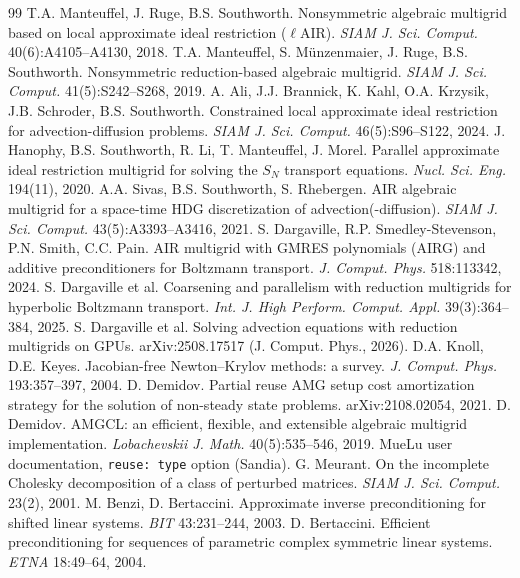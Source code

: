 \documentclass[11pt,a4paper]{article}
\begin{document}
\small
\begin{thebibliography}{99}
 T.A. Manteuffel, J. Ruge, B.S. Southworth. Nonsymmetric algebraic multigrid based on local approximate ideal restriction ($\ell$AIR). \emph{SIAM J. Sci. Comput.} 40(6):A4105--A4130, 2018.
 T.A. Manteuffel, S. M\"unzenmaier, J. Ruge, B.S. Southworth. Nonsymmetric reduction-based algebraic multigrid. \emph{SIAM J. Sci. Comput.} 41(5):S242--S268, 2019.
 A. Ali, J.J. Brannick, K. Kahl, O.A. Krzysik, J.B. Schroder, B.S. Southworth. Constrained local approximate ideal restriction for advection-diffusion problems. \emph{SIAM J. Sci. Comput.} 46(5):S96--S122, 2024.
 J. Hanophy, B.S. Southworth, R. Li, T. Manteuffel, J. Morel. Parallel approximate ideal restriction multigrid for solving the $S_N$ transport equations. \emph{Nucl. Sci. Eng.} 194(11), 2020.
 A.A. Sivas, B.S. Southworth, S. Rhebergen. AIR algebraic multigrid for a space-time HDG discretization of advection(-diffusion). \emph{SIAM J. Sci. Comput.} 43(5):A3393--A3416, 2021.
 S. Dargaville, R.P. Smedley-Stevenson, P.N. Smith, C.C. Pain. AIR multigrid with GMRES polynomials (AIRG) and additive preconditioners for Boltzmann transport. \emph{J. Comput. Phys.} 518:113342, 2024.
 S. Dargaville et al. Coarsening and parallelism with reduction multigrids for hyperbolic Boltzmann transport. \emph{Int. J. High Perform. Comput. Appl.} 39(3):364--384, 2025.
 S. Dargaville et al. Solving advection equations with reduction multigrids on GPUs. arXiv:2508.17517 (J. Comput. Phys., 2026).
 D.A. Knoll, D.E. Keyes. Jacobian-free Newton--Krylov methods: a survey. \emph{J. Comput. Phys.} 193:357--397, 2004.
 D. Demidov. Partial reuse AMG setup cost amortization strategy for the solution of non-steady state problems. arXiv:2108.02054, 2021.
 D. Demidov. AMGCL: an efficient, flexible, and extensible algebraic multigrid implementation. \emph{Lobachevskii J. Math.} 40(5):535--546, 2019.
 MueLu user documentation, \texttt{reuse: type} option (Sandia).
 G. Meurant. On the incomplete Cholesky decomposition of a class of perturbed matrices. \emph{SIAM J. Sci. Comput.} 23(2), 2001.
 M. Benzi, D. Bertaccini. Approximate inverse preconditioning for shifted linear systems. \emph{BIT} 43:231--244, 2003.
 D. Bertaccini. Efficient preconditioning for sequences of parametric complex symmetric linear systems. \emph{ETNA} 18:49--64, 2004.

\end{thebibliography}
\end{document}
